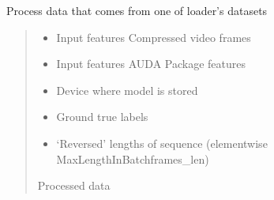 \documentclass[letterpaper,10pt,english]{sphinxmanual}
\begin{document}
\begin{fulllineitems}
\begin{fulllineitems}
\end{fulllineitems}


\begin{fulllineitems}
\label{\detokenize{net:net.UVANEMO.__process_loader_data}}
\pysigstartsignatures
{}
\pysigstopsignatures
\sphinxAtStartPar
Process data that comes from one of loader’s datasets
\begin{quote}\begin{description}
\begin{itemize}
\item {} 
\sphinxAtStartPar
{} \textendash{} Input features \sphinxhyphen{} Compressed video frames

\item {} 
\sphinxAtStartPar
{} \textendash{} Input features \sphinxhyphen{} AUDA Package features

\item {} 
\sphinxAtStartPar
{} \textendash{} Device where model is stored

\item {} 
\sphinxAtStartPar
{} \textendash{} Ground true labels

\item {} 
\sphinxAtStartPar
{} \textendash{} ‘Reversed’ lengths of sequence (element\sphinxhyphen{}wise MaxLengthInBatch\sphinxhyphen{}frames\_len)

\end{itemize}

\sphinxAtStartPar
Processed data

\end{description}\end{quote}

\end{fulllineitems}



\end{fulllineitems}
\end{document}
